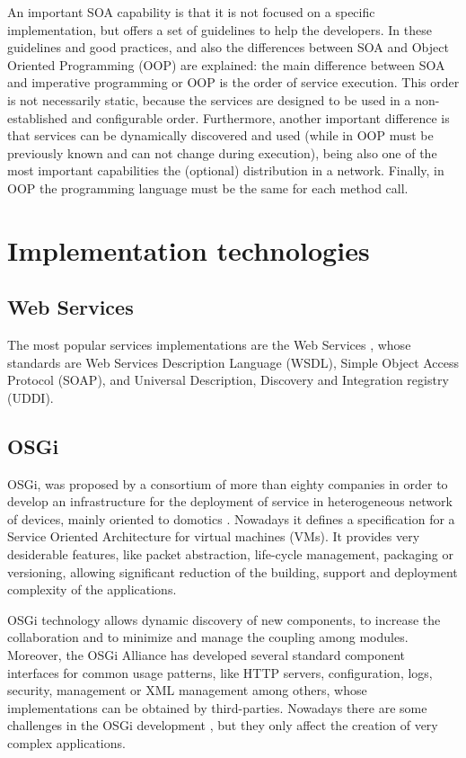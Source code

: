 An important SOA capability is that it is not focused on a specific
implementation, but offers a set of guidelines to help the
developers. In \citep{Arsanjani2008SOMA} these guidelines and good practices, and also the differences between SOA and Object Oriented
Programming (OOP) are
explained: the main difference between SOA and imperative programming or OOP is the order of service execution. This order is not necessarily static, because the services are designed to be used in a non-established and configurable order. Furthermore, another important difference is that services can be dynamically discovered and used (while in OOP must be previously known and can not change during execution), being also one of the most important capabilities the (optional) distribution in a network. Finally, in OOP the programming language must be the same for each method call.

\section{Implementation technologies}

\subsection{Web Services}

The most popular services implementations are the Web Services \cite{Papazoglou2007SOA}, whose standards are Web Services Description Language (WSDL), Simple Object Access Protocol (SOAP), and Universal Description, Discovery and Integration registry (UDDI).



\subsection{OSGi}
OSGi, was proposed by a consortium of more than
eighty companies in order to develop an infrastructure for the
deployment of service in heterogeneous network of devices, mainly
oriented to domotics \cite{GarciaSanchez2013Gateway}. Nowadays it defines a
specification for a Service Oriented Architecture for virtual
machines (VMs). It provides very desiderable features, like
packet abstraction, life-cycle management, packaging or versioning,
allowing significant reduction of the building, support and deployment
complexity of the applications. 

OSGi technology allows dynamic discovery of new components, to increase the collaboration and to minimize and manage the coupling
among modules. Moreover, the
OSGi Alliance has developed several standard component interfaces for
common usage patterns, like HTTP servers, configuration, logs, security,
management or XML management among others, whose implementations can
be obtained by third-parties. Nowadays there are some challenges 
in the OSGi development \cite{Kriens2008OsgiChallenges}, but they only affect the creation of very complex applications.


